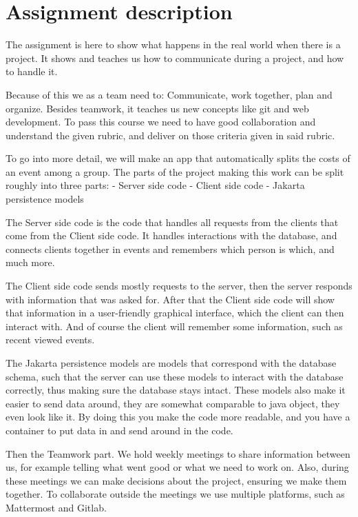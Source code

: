 \section{Assignment description}

The assignment is here to show what happens in the real world when there is a project.
It shows and teaches us how to communicate during a project, and how to handle it.

Because of this we as a team need to: Communicate, work together, plan and organize.
Besides teamwork, it teaches us new concepts like git and web development.
To pass this course we need to have good collaboration and understand the given rubric, and deliver on those criteria given in said rubric.

To go into more detail, we will make an app that automatically splits the costs of an event among a group.
The parts of the project making this work can be split roughly into three parts:
    - Server side code
    - Client side code
    - Jakarta persistence models

The Server side code is the code that handles all requests from the clients that come from the Client side code.
It handles interactions with the database, and connects clients together in events and remembers which person is which, and much more.

The Client side code sends mostly requests to the server, then the server responds with information that was asked for.
After that the Client side code will show that information in a user-friendly graphical interface, which the client can then interact with.
And of course the client will remember some information, such as recent viewed events.

The Jakarta persistence models are models that correspond with the database schema, such that the server can use these models to interact with the database correctly, thus making sure the database stays intact.
These models also make it easier to send data around, they are somewhat comparable to java object, they even look like it.
By doing this you make the code more readable, and you have a container to put data in and send around in the code.


Then the Teamwork part.
We hold weekly meetings to share information between us, for example telling what went good or what we need to work on.
Also, during these meetings we can make decisions about the project, ensuring we make them together.
To collaborate outside the meetings we use multiple platforms, such as Mattermost and Gitlab.
